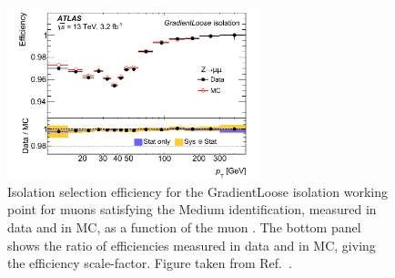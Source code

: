 \begin{figure}[!htb]
    \begin{center}
        \includegraphics[width=0.65\textwidth]{figures/chapter3/iso_eff_muon}
        \caption{
            Isolation selection efficiency for the GradientLoose isolation working point for muons satisfying
            the Medium identification,
            measured in data and in MC, as a function of the muon \pT.
            The bottom panel shows the ratio of efficiencies measured in data and in MC, giving
            the efficiency scale-factor.
            Figure taken from Ref.~\cite{Aad:2016jkr}.
        }
        \label{fig:muon_iso_eff}
    \end{center}
\end{figure}

\FloatBarrier
